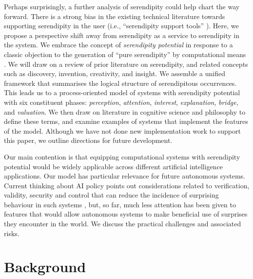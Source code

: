 Perhaps surprisingly, a further analysis of serendipity could help chart the way forward.  There is a strong bias in the existing technical literature towards supporting serendipity in the user (i.e., ``serendipity support tools'' \cite{andre2009discovery}).  Here, we propose a perspective shift away from serendipity as a service to serendipity in the system.  We embrace the concept of \emph{serendipity potential} in response to a classic objection to the generation of ``pure serendipity'' by computational means \cite{van1994anatomy}.
We will draw on a review of prior literature on serendipity, and related concepts such as discovery, invention, creativity, and insight.  We assemble a unified framework that summarises the logical structure of serendipitous occurrences.
This leads us to a process-oriented model of systems with serendipity potential with six constituent phases:
\emph{perception}, \emph{attention}, \emph{interest}, \emph{explanation}, \emph{bridge}, and \emph{valuation}.
We then draw on literature in cognitive science and philosophy to define these terms, and examine examples of systems that implement the features of the model.
Although we have not done new implementation work to support this paper, we outline directions for future development.

Our main contention is that equipping computational systems with serendipity potential would be widely applicable across different artificial intelligence applications.  Our model has particular relevance for future autonomous systems.  Current thinking about AI policy points out considerations related to verification, validity, security and control that can reduce the incidence of surprising behaviour in such systems \cite{research-priorities}, but, so far, much less attention has been given to features that would allow autonomous systems to make beneficial use of surprises they encounter in the world.  We discuss the practical challenges and associated risks.

\section{Background} \label{sec:background}

